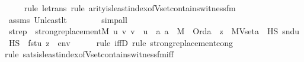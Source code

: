\begin{isabellebody}
\ \ \ \ \isamarkupfalse%
{\isacharparenleft}{\kern0pt}rule\ le{\isacharunderscore}{\kern0pt}trans{\isacharcomma}{\kern0pt}\ rule\ arity{\isacharunderscore}{\kern0pt}is{\isacharunderscore}{\kern0pt}least{\isacharunderscore}{\kern0pt}index{\isacharunderscore}{\kern0pt}of{\isacharunderscore}{\kern0pt}Vset{\isacharunderscore}{\kern0pt}contains{\isacharunderscore}{\kern0pt}witness{\isacharunderscore}{\kern0pt}fm{\isacharparenright}{\kern0pt}\isanewline
\ \ \ \ \isamarkupfalse%
\ assms\ Un{\isacharunderscore}{\kern0pt}least{\isacharunderscore}{\kern0pt}lt\isanewline
\ \ \ \ \ \ \isamarkupfalse%
\ simp{\isacharunderscore}{\kern0pt}all\isanewline
\ \ \ \ \isamarkupfalse%
\isanewline
\isanewline
\ \ \isamarkupfalse%
\ strep{\isacharprime}{\kern0pt}\ {\isacharcolon}{\kern0pt}\ {\isachardoublequoteopen}strong{\isacharunderscore}{\kern0pt}replacement{\isacharparenleft}{\kern0pt}{\isacharhash}{\kern0pt}{\isacharhash}{\kern0pt}M{\isacharcomma}{\kern0pt}\ {\isasymlambda}u\ v{\isachardot}{\kern0pt}\ v\ {\isacharequal}{\kern0pt}\ {\isacharless}{\kern0pt}u{\isacharcomma}{\kern0pt}\ {\isacharparenleft}{\kern0pt}{\isasymmu}\ a{\isachardot}{\kern0pt}\ a\ {\isasymin}\ M\ {\isasymand}\ Ord{\isacharparenleft}{\kern0pt}a{\isacharparenright}{\kern0pt}\ {\isasymand}\ {\isacharparenleft}{\kern0pt}{\isasymexists}z\ {\isasymin}\ MVset{\isacharparenleft}{\kern0pt}a{\isacharparenright}{\kern0pt}\ {\isasyminter}\ HS{\isachardot}{\kern0pt}\ snd{\isacharparenleft}{\kern0pt}u{\isacharparenright}{\kern0pt}\ {\isasymtturnstile}HS\ {\isasymphi}\ {\isacharparenleft}{\kern0pt}{\isacharbrackleft}{\kern0pt}fst{\isacharparenleft}{\kern0pt}u{\isacharparenright}{\kern0pt}{\isacharcomma}{\kern0pt}\ z{\isacharbrackright}{\kern0pt}\ {\isacharat}{\kern0pt}\ env{\isacharparenright}{\kern0pt}{\isacharparenright}{\kern0pt}{\isacharparenright}{\kern0pt}{\isachargreater}{\kern0pt}{\isacharparenright}{\kern0pt}{\isachardoublequoteclose}\ \isanewline
\ \ \ \ \isamarkupfalse%
{\isacharparenleft}{\kern0pt}rule\ iffD{}{\isacharcomma}{\kern0pt}\ rule\ strong{\isacharunderscore}{\kern0pt}replacement{\isacharunderscore}{\kern0pt}cong{\isacharparenright}{\kern0pt}\isanewline
\ \ \ \ \ \isamarkupfalse%
{\isacharparenleft}{\kern0pt}rule\ sats{\isacharunderscore}{\kern0pt}is{\isacharunderscore}{\kern0pt}least{\isacharunderscore}{\kern0pt}index{\isacharunderscore}{\kern0pt}of{\isacharunderscore}{\kern0pt}Vset{\isacharunderscore}{\kern0pt}contains{\isacharunderscore}{\kern0pt}witness{\isacharunderscore}{\kern0pt}fm{\isacharunderscore}{\kern0pt}iff{\isacharparenright}{\kern0pt}\isanewline

\end{isabellebody}
